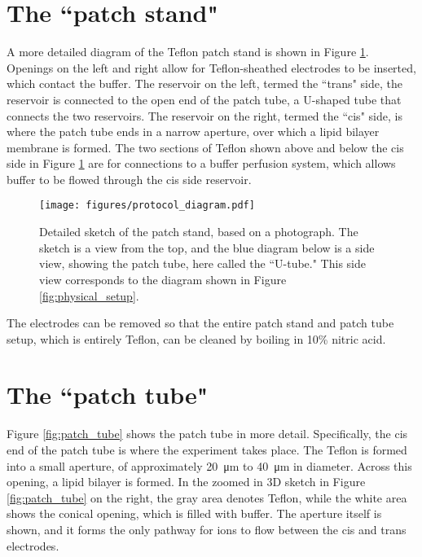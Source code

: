 \section{The ``patch stand"}

A more detailed diagram of the Teflon patch stand is shown in Figure \ref{fig:patch_stand}.  Openings on the left and right allow for Teflon-sheathed electrodes to be inserted, which contact the buffer.  The reservoir on the left, termed the ``trans" side, the reservoir is connected to the open end of the patch tube, a U-shaped tube that connects the two reservoirs.  The reservoir on the right, termed the ``cis" side, is where the patch tube ends in a narrow aperture, over which a lipid bilayer membrane is formed.  The two sections of Teflon shown above and below the cis side in Figure \ref{fig:patch_stand} are for connections to a buffer perfusion system, which allows buffer to be flowed through the cis side reservoir.

\begin{figure}[h]
\begin{centering}
\texttt{[image: figures/protocol\_diagram.pdf]}
\caption[Schematic of patch stand]{Detailed sketch of the patch stand, based on a photograph.  The sketch is a view from the top, and the blue diagram below is a side view, showing the patch tube, here called the ``U-tube."  This side view corresponds to the diagram shown in Figure \ref{fig:physical_setup}.}
\label{fig:patch_stand}
\end{centering}
\end{figure}

The electrodes can be removed so that the entire patch stand and patch tube setup, which is entirely Teflon, can be cleaned by boiling in 10\% nitric acid.

\section{The ``patch tube"}

Figure \ref{fig:patch_tube} shows the patch tube in more detail.  Specifically, the cis end of the patch tube is where the experiment takes place.  The Teflon is formed into a small aperture, of approximately \SI{20}{\um} to \SI{40}{\um} in diameter.  Across this opening, a lipid bilayer is formed.  In the zoomed in 3D sketch in Figure \ref{fig:patch_tube} on the right, the gray area denotes Teflon, while the white area shows the conical opening, which is filled with buffer.  The aperture itself is shown, and it forms the only pathway for ions to flow between the cis and trans electrodes.

